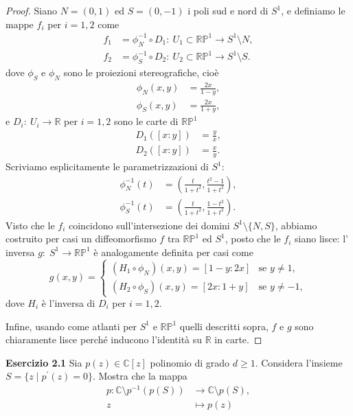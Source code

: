 \documentclass[a4paper]{article}
\newcommand{\R}{\mathbb{R}}
\newcommand{\C}{\mathbb{C}}
\renewcommand{\P}{\mathbb{P}}
\theoremstyle{definition}
\theoremstyle{definition}
\theoremstyle{remark}
\theoremstyle{definition}
\begin{document}
\begin{proof}
    Siano $N=(0,1)$ ed $S=(0,-1)$ i poli sud e nord di $S^1$, e definiamo le mappe $f_i$ per $i=1,2$ come
    \begin{align*}
        f_1 & =\phi_N^{-1}\circ D_1 :\: U_1\subset\R\P^1\to S^1\setminus N, \\
        f_2 & =\phi_S^{-1}\circ D_2 :\: U_2\subset\R\P^1\to S^1\setminus S.
    \end{align*}
    dove $\phi_S$ e $\phi_N$ sono le proiezioni stereografiche, cioè
    \begin{align*}
        \phi_N (x,y) & = \frac{2x}{1-y}, \\
        \phi_S (x,y) & = \frac{2x}{1+y},
    \end{align*}
    e $D_i:\:U_i\to\R$ per $i=1,2$ sono le carte di $\R\P^1$
    \begin{align*}
        D_1([x : y]) & = \frac{y}{x}, \\
        D_2([x : y]) & = \frac{x}{y}.
    \end{align*}
    Scriviamo esplicitamente le parametrizzazioni di $S^1$:
    \begin{align*}
        \phi_N^{-1}(t) & = \left( \frac{t}{1+t^2}, \frac{t^2-1}{1+t^2} \right), \\
        \phi_S^{-1}(t) & = \left( \frac{t}{1+t^2}, \frac{1-t^2}{1+t^2} \right).
    \end{align*}
    Visto che le $f_i$ coincidono sull'intersezione dei domini $S^1 \setminus \{ N, S \}$, abbiamo costruito per casi un diffeomorfismo $f$ tra $\R\P^1$ ed $S^1$, posto che le $f_i$ siano lisce: l' inversa
    $g :\; S^1 \to \R\P^1$ è analogamente definita per casi come
    \[
        g(x,y) = \begin{cases}
            (H_1\circ\phi_N)(x,y)=[1-y:2x] & \text{se } y \neq 1,  \\
            (H_2\circ\phi_S)(x,y)=[2x:1+y] & \text{se } y \neq -1,
        \end{cases}
    \]
    dove $H_i$ è l'inversa di $D_i$ per $i=1,2$.

    Infine, usando come atlanti per $S^1$ e $\R\P^1$ quelli descritti sopra, $f$ e $g$ sono chiaramente lisce perché inducono l'identità su $\R$ in carte.
\end{proof}
\textbf{Esercizio 2.1}
Sia $p(z)\in\C[z]$ polinomio di grado $d\geq1$. Considera l'insieme
$S = \{z \mid p^{\prime} (z) = 0\}.$ Mostra che la mappa
\begin{align*}
    p: \C \setminus p^{-1}(p(S)) & \to \C \setminus p(S), \\
    z                            & \mapsto p(z)
\end{align*}
\end{document}
